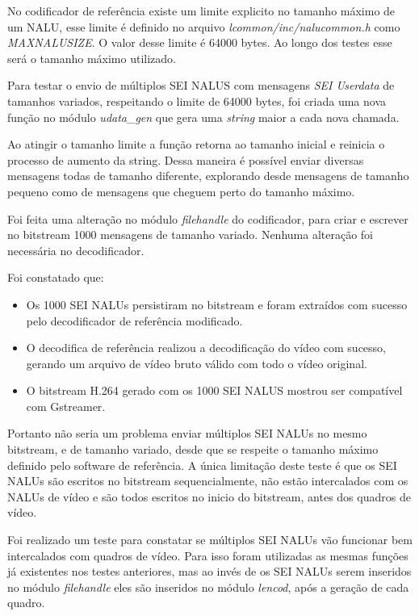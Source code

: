 No codificador de referência existe um limite explicito no tamanho máximo de um NALU, esse limite é definido no arquivo \textit{lcommon/inc/nalucommon.h} como \textit{MAXNALUSIZE}. O valor desse limite é 64000 bytes. Ao longo dos testes esse será o tamanho máximo utilizado.

Para testar o envio de múltiplos SEI NALUS com mensagens \textit{SEI Userdata} de tamanhos variados, respeitando o limite de 64000 bytes, foi criada uma nova função no módulo \textit{udata\_gen} que gera uma \textit{string} maior a cada nova chamada. 

Ao atingir o tamanho limite a função retorna ao tamanho inicial e reinicia o processo de aumento da string. Dessa maneira é possível enviar diversas mensagens todas de tamanho diferente, explorando desde mensagens de tamanho pequeno como de mensagens que cheguem perto do tamanho máximo.

Foi feita uma alteração no módulo \textit{filehandle} do codificador, para criar e escrever no bitstream 1000 mensagens de tamanho variado. Nenhuma alteração foi necessária no decodificador.

Foi constatado que:

\begin{itemize}
        \item Os 1000 SEI NALUs persistiram no bitstream e foram extraídos com sucesso pelo decodificador de referência modificado.
        \item O decodifica de referência realizou a decodificação do vídeo com sucesso, gerando um arquivo de vídeo bruto válido com todo o vídeo original.
        \item O bitstream H.264 gerado com os 1000 SEI NALUS mostrou ser compatível com Gstreamer.
\end{itemize}

Portanto não seria um problema enviar múltiplos SEI NALUs no mesmo bitstream, e de tamanho variado, desde que se respeite o tamanho máximo definido pelo software de referência. A única limitação deste teste é que os SEI NALUs são escritos no bitstream sequencialmente, não estão intercalados com os NALUs de vídeo e são todos escritos no inicio do bitstream, antes dos quadros de vídeo.

Foi realizado um teste para constatar se múltiplos SEI NALUs vão funcionar bem intercalados com quadros de vídeo. Para isso foram utilizadas as mesmas funções já existentes nos testes anteriores, mas ao invés de os SEI NALUs serem inseridos no módulo \textit{filehandle} eles são inseridos no módulo \textit{lencod}, após a geração de cada quadro. 

